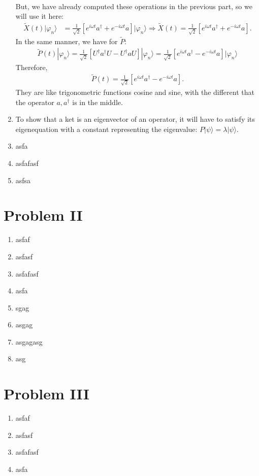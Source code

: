 \documentclass[letterpaper,11pt,twoside]{article}
\newcommand{\ket}[1]{|#1\rangle}
\begin{document}
\begin{enumerate}[itemsep=0pt,topsep=0pt,label=\alph*)]
\begin{align*}
  \end{align*}
  But, we have already computed these operations in the previous part, so we will use it here:
  \begin{align*}
    \tilde{X}(t)\ket{\varphi_n}&=\frac{1}{\sqrt{2}}\left[e^{i\omega t}a^\dagger+e^{-i\omega t}a\right]\ket{\varphi_n}\Longrightarrow \tilde{X}(t)=\frac{1}{\sqrt{2}}\left[e^{i\omega t}a^\dagger+e^{-i\omega t}a\right].
  \end{align*}
  In the same manner, we have for $\tilde{P}$:
  \begin{align*}
    \tilde{P}(t)\ket{\varphi_n}=\frac{1}{\sqrt{2}}\left[U^\dagger a^\dagger U-U^\dagger aU\right]\ket{\varphi_n}=\frac{1}{\sqrt{2}}\left[e^{i\omega t}a^\dagger-e^{-i\omega t}a\right]\ket{\varphi_n}
  \end{align*}
  Therefore,
  \begin{align*}
    \tilde{P}(t)=\frac{1}{\sqrt{2}}\left[e^{i\omega t}a^\dagger-e^{-i\omega t}a\right].
  \end{align*}
  They are like trigonometric functions cosine and sine, with the different that the operator $a,a^\dagger$ is in the middle.
  \item To show that a ket is an eigenvector of an operator, it will have to satisfy its eigenequation with a constant representing the eigenvalue: $P\ket{\psi}=\lambda\ket{\psi}$.
  \item asfa
  \item asfafasf
  \item asfsa
\end{enumerate}


\section*{Problem II}
\begin{enumerate}[itemsep=0pt,topsep=0pt,label=\alph*)]
  \item asfaf
  \item asfasf
  \item asfafasf
  \item asfa
  \item sgag
  \item asgag
  \item asgagasg
  \item asg
\end{enumerate}


\section*{Problem III}
\begin{enumerate}[itemsep=0pt,topsep=0pt,label=\alph*)]
  \item asfaf
  \item asfasf
  \item asfafasf
  \item asfa
\end{enumerate}
\end{document}
